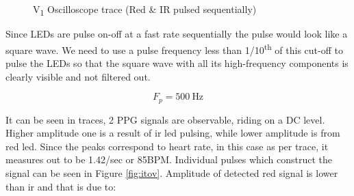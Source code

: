 			\begin{figure}[ht!]
				\centering
				\hfill
				\caption{V\textsubscript{1} Oscilloscope trace (Red \& IR pulsed sequentially) }
			\end{figure}
		
			Since LEDs are pulse on-off at a fast rate sequentially the pulse would look like a square wave. We need to use a pulse frequency less than 1/10\textsuperscript{th} of this cut-off to pulse the LEDs so that the square wave with all its high-frequency components is clearly visible and not filtered out.
			
			\[	
			F_p = \SI{500}{\hertz}
			\]
					
		
			It can be seen in traces, 2 PPG signals are observable, riding on a DC level. Higher amplitude one is a result of ir led pulsing, while lower amplitude is from red led. Since the peaks correspond to heart rate, in this case as per trace, it measures out to be 1.42/sec or 85BPM. Individual pulses which construct the signal can be seen in Figure \ref{fig:itov}. Amplitude of detected red signal is lower than ir and that is due to:
			
